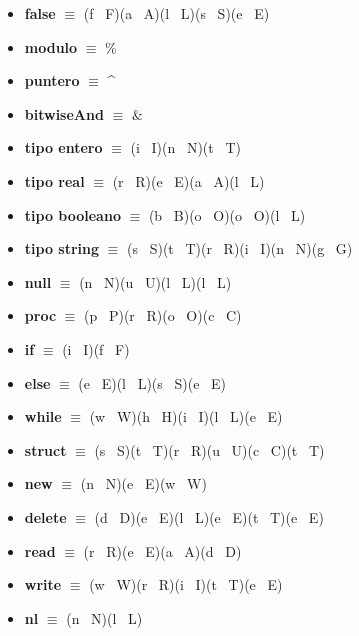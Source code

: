 \documentclass[11pt]{article}
\begin{document}
\begin{itemize}
            \item \textbf{false }$\equiv$ (f \textbar\ F)(a \textbar\ A)(l \textbar\ L)(s \textbar\ S)(e \textbar\ E)
            \item \textbf{modulo }$\equiv$ \%
            \item \textbf{puntero }$\equiv$ \^{}
            \item \textbf{bitwiseAnd }$\equiv$ $\&$
            \item \textbf{tipo entero }$\equiv$ (i \textbar\ I)(n \textbar\ N)(t \textbar\ T)
            \item \textbf{tipo real }$\equiv$ (r \textbar\ R)(e \textbar\ E)(a \textbar\ A)(l \textbar\ L)
            \item \textbf{tipo booleano }$\equiv$ (b \textbar\ B)(o \textbar\ O)(o \textbar\ O)(l \textbar\ L)
            \item \textbf{tipo string }$\equiv$ (s \textbar\ S)(t \textbar\ T)(r \textbar\ R)(i \textbar\ I)(n \textbar\ N)(g \textbar\ G)
            \item \textbf{null }$\equiv$ (n \textbar\ N)(u \textbar\ U)(l \textbar\ L)(l \textbar\ L)
            \item \textbf{proc }$\equiv$ (p \textbar\ P)(r \textbar\ R)(o \textbar\ O)(c \textbar\ C)
            \item \textbf{if }$\equiv$ (i \textbar\ I)(f \textbar\ F)
            \item \textbf{else }$\equiv$ (e \textbar\ E)(l \textbar\ L)(s \textbar\ S)(e \textbar\ E)
            \item \textbf{while }$\equiv$ (w \textbar\ W)(h \textbar\ H)(i \textbar\ I)(l \textbar\ L)(e \textbar\ E)
            \item \textbf{struct }$\equiv$ (s \textbar\ S)(t \textbar\ T)(r \textbar\ R)(u \textbar\ U)(c \textbar\ C)(t \textbar\ T)
            \item \textbf{new }$\equiv$ (n \textbar\ N)(e \textbar\ E)(w \textbar\ W)
            \item \textbf{delete }$\equiv$ (d \textbar\ D)(e \textbar\ E)(l \textbar\ L)(e \textbar\ E)(t \textbar\ T)(e \textbar\ E)
            \item \textbf{read }$\equiv$ (r \textbar\ R)(e \textbar\ E)(a \textbar\ A)(d \textbar\ D)
            \item \textbf{write }$\equiv$ (w \textbar\ W)(r \textbar\ R)(i \textbar\ I)(t \textbar\ T)(e \textbar\ E)
            \item \textbf{nl }$\equiv$ (n \textbar\ N)(l \textbar\ L)

\end{itemize}
\end{document}
